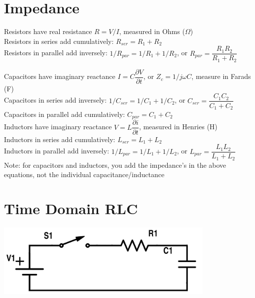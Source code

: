 \documentclass[12pt]{article}
\begin{document}
\section*{Impedance}
Resistors have real resistance $R = V/I$, measured in Ohms ($\Omega$)\\
Resistors in series add cumulatively: $R_{ser} = R_1+R_2$\\
Resistors in parallel add inversely:  $1/R_{par} = 1/R_1 + 1/R_2$, or $R_{par} = \dfrac{R_1R_2}{R_1+R_2}$\\

\newpage

Capacitors have imaginary reactance $I = C \dfrac{\partial V}{\partial t}$, or $Z_c = 1/j\omega C$, measure in Farads (F)\\
Capacitors in series add inversely: $1/C_{ser} = 1/C_1 + 1/C_2$, or $C_{ser} = \dfrac{C_1C_2}{C_1+C_2}$\\
Capacitors in parallel add cumulatively: $C_{par} = C_1 + C_2$\\

Inductors have imaginary reactance $V = L \dfrac{\partial i}{\partial t}$, measured in Henries (H)\\
Inductors in series add cumulatively: $L_{ser} = L_1 + L_2$\\
Inductors in parallel add inversely: $1/L_{par} = 1/L_1 + 1/L_2$, or $L_{par} = \dfrac{L_1L_2}{L_1+L_2}$\\

Note: for capacitors and inductors, you add the impedance's in the above equations, not the individual capacitance/inductance


\section*{Time Domain RLC}
\begin{center}
	\includegraphics[width=0.8\textwidth]{assets/ece210-rc.png}
\end{center}
\end{document}
